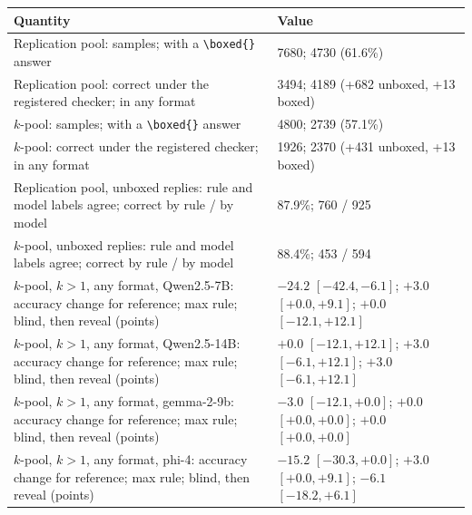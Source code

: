 \begin{tabular}{L{7.6cm}L{5.4cm}}
\toprule
Quantity & Value \\
\midrule
Replication pool: samples; with a \texttt{\textbackslash boxed\{\}} answer & 7680; 4730 (61.6\%) \\
Replication pool: correct under the registered checker; in any format & 3494; 4189 (+682 unboxed, +13 boxed) \\
$k$-pool: samples; with a \texttt{\textbackslash boxed\{\}} answer & 4800; 2739 (57.1\%) \\
$k$-pool: correct under the registered checker; in any format & 1926; 2370 (+431 unboxed, +13 boxed) \\
Replication pool, unboxed replies: rule and model labels agree; correct by rule / by model & 87.9\%; 760 / 925 \\
$k$-pool, unboxed replies: rule and model labels agree; correct by rule / by model & 88.4\%; 453 / 594 \\
$k$-pool, $k{>}1$, any format, Qwen2.5-7B: accuracy change for reference; max rule; blind, then reveal (points) & $-24.2$ {\scriptsize$[-42.4,-6.1]$}; $+3.0$ {\scriptsize$[+0.0,+9.1]$}; $+0.0$ {\scriptsize$[-12.1,+12.1]$} \\
$k$-pool, $k{>}1$, any format, Qwen2.5-14B: accuracy change for reference; max rule; blind, then reveal (points) & $+0.0$ {\scriptsize$[-12.1,+12.1]$}; $+3.0$ {\scriptsize$[-6.1,+12.1]$}; $+3.0$ {\scriptsize$[-6.1,+12.1]$} \\
$k$-pool, $k{>}1$, any format, gemma-2-9b: accuracy change for reference; max rule; blind, then reveal (points) & $-3.0$ {\scriptsize$[-12.1,+0.0]$}; $+0.0$ {\scriptsize$[+0.0,+0.0]$}; $+0.0$ {\scriptsize$[+0.0,+0.0]$} \\
$k$-pool, $k{>}1$, any format, phi-4: accuracy change for reference; max rule; blind, then reveal (points) & $-15.2$ {\scriptsize$[-30.3,+0.0]$}; $+3.0$ {\scriptsize$[+0.0,+9.1]$}; $-6.1$ {\scriptsize$[-18.2,+6.1]$} \\
\bottomrule
\end{tabular}

